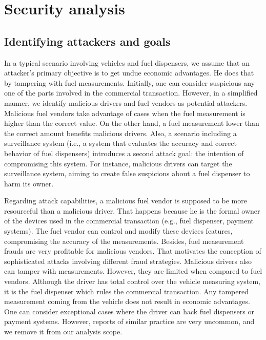 \documentclass[sigplan]{acmart}
\begin{document}
\section{Security analysis}
\subsection{Identifying attackers and goals}
In a typical scenario involving vehicles and fuel dispensers, we assume that an attacker's primary objective is to get undue economic advantages.
He does that by tampering with fuel measurements.
Initially, one can consider suspicious any one of the parts involved in the commercial transaction.
However, in a simplified manner, we identify malicious drivers and fuel vendors as potential attackers.
Malicious fuel vendors take advantage of cases when the fuel measurement is higher than the correct value.
On the other hand, a fuel measurement lower than the correct amount benefits malicious drivers.
Also, a scenario including a surveillance system (i.e., a system that evaluates the accuracy and correct behavior of fuel dispensers) introduces a second attack goal: the intention of compromising this system.
For instance, malicious drivers can target the surveillance system, aiming to create false suspicions about a fuel dispenser to harm its owner.

Regarding attack capabilities, a malicious fuel vendor is supposed to be more resourceful than a malicious driver. 
That happens because he is the formal owner of the devices used in the commercial transaction (e.g., fuel dispenser, payment systems).
The fuel vendor can control and modify these devices features, compromising the accuracy of the measurements.
Besides, fuel measurement frauds are very profitable for malicious vendors.
That motivates the conception of sophisticated attacks involving different fraud strategies. 
Malicious drivers also can tamper with measurements.
However, they are limited when compared to fuel vendors.
Although the driver has total control over the vehicle measuring system, it is the fuel dispenser which rules the commercial transaction.
Any tampered measurement coming from the vehicle does not result in economic advantages.
One can consider exceptional cases where the driver can hack fuel dispensers or payment systems.
However, reports of similar practice are very uncommon, and we remove it from our analysis scope.
\end{document}
